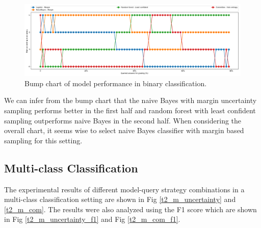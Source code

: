  \begin{figure}[!htb]
 	\includegraphics[scale=0.3]{images/binary/task2_rank}
 	\caption{Bump chart of model performance in binary classification.}
 	\label{t2_b_bump}
 \end{figure}


 We can infer from the bump chart that the naive Bayes with margin uncertainty sampling performs better in the first half and random forest with least confident sampling outperforms naive Bayes in the second half. When considering the overall chart, it seems wise to select naive Bayes classifier with margin based sampling for this setting. 
 
 
 
 
 \clearpage
 \subsection{Multi-class Classification}
 
 The experimental results of different model-query strategy combinations in a multi-class classification setting are shown in Fig \ref{t2_m_uncertainty} and \ref{t2_m_com}. The results were also analyzed using the F1 score which are shown in Fig \ref{t2_m_uncertainty_f1} and Fig \ref{t2_m_com_f1}.
 
